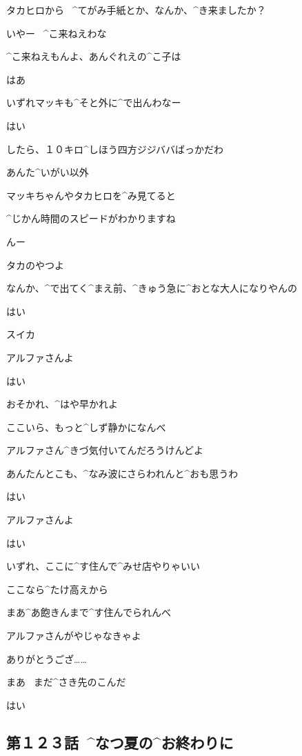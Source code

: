 \page
\Alpha タカヒロから
\ ^{てがみ}{手紙}とか、なんか、^{き}{来}ましたか？

\Ojisan いやー
\ ^{こ}{来}ねえわな

\Ojisan ^{こ}{来}ねえもんよ、あんぐれえの^{こ}{子}は

\Alpha はあ

\page
\Ojisan いずれマッキも^{そと}{外}に^{で}{出}んわなー

\Alpha はい

\Ojisan したら、１０キロ^{しほう}{四方}ジジババばっかだわ

\Ojisan あんた^{いがい}{以外}

\page
\Alpha マッキちゃんやタカヒロを^{み}{見}てると

\Alpha ^{じかん}{時間}のスピードがわかりますね

\Ojisan んー

\Ojisan タカのやつよ

\Ojisan なんか、^{で}{出}てく^{まえ}{前}、^{きゅう}{急}に^{おとな}{大人}になりやんの

\page
\Alpha はい

\Sign スイカ

\page
\Ojisan アルファさんよ

\Alpha はい

\Ojisan おそかれ、^{はや}{早}かれよ

\Ojisan ここいら、もっと^{しず}{静}かになんべ

\page
\Ojisan アルファさん^{きづ}{気付}いてんだろうけんどよ

\Ojisan あんたんとこも、^{なみ}{波}にさらわれんと^{おも}{思}うわ

\Alpha はい

\page
\Ojisan アルファさんよ

\Alpha はい

\Ojisan いずれ、ここに^{す}{住}んで^{みせ}{店}やりゃいい

\Ojisan ここなら^{たけ}{高}えから

\Ojisan まあ^{あ}{飽}きんまで^{す}{住}んでられんべ

\page
\Ojisan アルファさんがやじゃなきゃよ

\Alpha ありがとうござ……

\page[34]
\Ojisan まあ
\ まだ^{さき}{先}のこんだ

\Alpha はい


\subsection{第１２３話\ ^{なつ}{夏}の^{お}{終}わりに}


